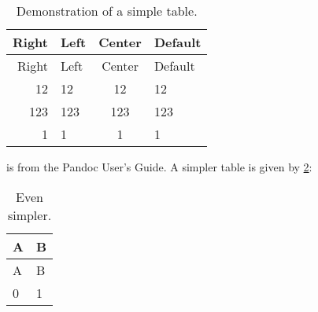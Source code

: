 \begin{longtable}[]{@{}rlcl@{}}
\caption{Demonstration of a simple table. \label{tbl:1}}\tabularnewline
\toprule
Right & Left & Center & Default\tabularnewline
\midrule
\endfirsthead
\toprule
Right & Left & Center & Default\tabularnewline
\midrule
\endhead
12 & 12 & 12 & 12\tabularnewline
123 & 123 & 123 & 123\tabularnewline
1 & 1 & 1 & 1\tabularnewline
\bottomrule
\end{longtable}

 is from the Pandoc User's Guide. A simpler table is given
by \cref{tbl:2}:

\begin{longtable}[]{@{}ll@{}}
\caption{Even simpler. \label{tbl:2}}\tabularnewline
\toprule
A & B\tabularnewline
\midrule
\endfirsthead
\toprule
A & B\tabularnewline
\midrule
\endhead
0 & 1\tabularnewline
\bottomrule
\end{longtable}
